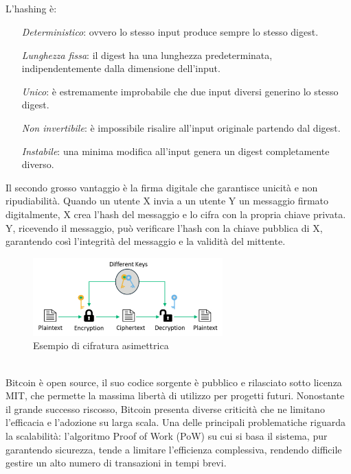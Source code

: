 \\
\\
\\
\\
L’hashing è: 
\begin{itemize}
    \item[\textit{Deterministico}:] ovvero lo stesso input produce sempre lo stesso digest.
    \item [\textit{Lunghezza fissa}:] il digest ha una lunghezza predeterminata, indipendentemente dalla dimensione dell’input.
    \item [\textit{Unico}:] è estremamente improbabile che due input diversi generino lo stesso digest.
    \item [\textit{Non invertibile}:] è impossibile risalire all’input originale partendo dal digest.
    \item [\textit{Instabile}:] una minima modifica all’input genera un digest completamente diverso.
\end{itemize}
Il secondo grosso vantaggio è la firma digitale che garantisce unicità e non ripudiabilità. Quando un utente X invia a un utente Y un messaggio firmato digitalmente, X crea l’hash del messaggio e lo cifra con la propria chiave privata. Y, ricevendo il messaggio, può verificare l’hash con la chiave pubblica di X, garantendo così l’integrità del messaggio e la validità del mittente.
\begin{figure}[h]
\caption{Esempio di cifratura asimettrica}
\centering
\includegraphics[width=0.65\textwidth]{Immagini/cifratura asimmetrica.png}
\end{figure}
\\
Bitcoin è open source, il suo codice sorgente è pubblico e rilasciato sotto licenza MIT, che permette la massima libertà di utilizzo per progetti futuri.
Nonostante il grande successo riscosso, Bitcoin presenta diverse criticità che ne limitano l'efficacia e l'adozione su larga scala. Una delle principali problematiche riguarda la scalabilità: l'algoritmo Proof of Work (PoW) su cui si basa il sistema, pur garantendo sicurezza, tende a limitare l'efficienza complessiva, rendendo difficile gestire un alto numero di transazioni in tempi brevi.
